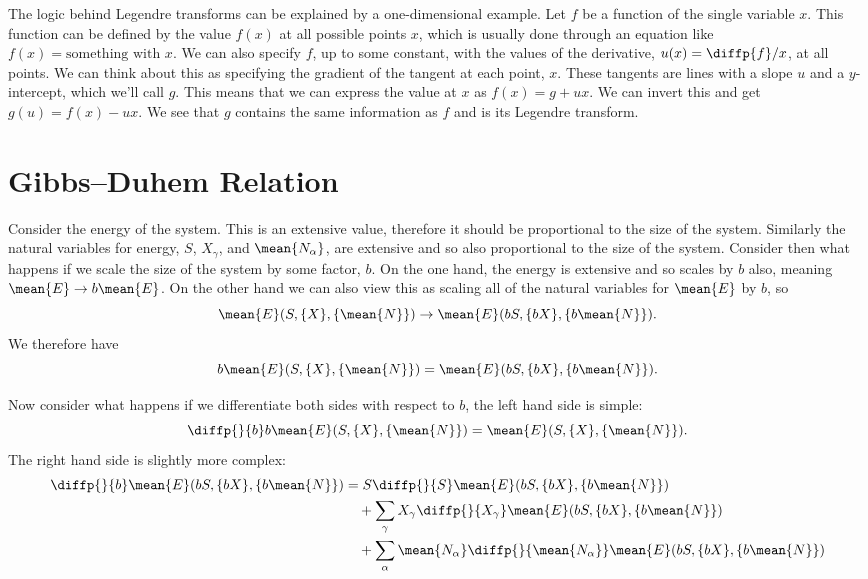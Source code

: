 \documentclass[fleqn]{NotesClass}
\begin{document}
    The logic behind Legendre transforms can be explained by a one-dimensional example.
    Let \(f\) be a function of the single variable \(x\).
    This function can be defined by the value \(f(x)\) at all possible points \(x\), which is usually done through an equation like \(f(x) = \text{something with }x\).
    We can also specify \(f\), up to some constant, with the values of the derivative, \(u(x) = \diffp{f}/{x}\), at all points.
    We can think about this as specifying the gradient of the tangent at each point, \(x\).
    These tangents are lines with a slope \(u\) and a \(y\)-intercept, which we'll call \(g\).
    This means that we can express the value at \(x\) as \(f(x) = g + ux\).
    We can invert this and get \(g(u) = f(x) - ux\).
    We see that \(g\) contains the same information as \(f\) and is its Legendre transform.
    
    \section{Gibbs--Duhem Relation}
    Consider the energy of the system.
    This is an extensive value, therefore it should be proportional to the size of the system.
    Similarly the natural variables for energy, \(S\), \(X_\gamma\), and \(\mean{N_\alpha}\), are extensive and so also proportional to the size of the system.
    Consider then what happens if we scale the size of the system by some factor, \(b\).
    On the one hand, the energy is extensive and so scales by \(b\) also, meaning \(\mean{E} \to b\mean{E}\).
    On the other hand we can also view this as scaling all of the natural variables for \(\mean{E}\) by \(b\), so
    \begin{equation}
        \mean{E}(S, \{X\}, \{\mean{N}\}) \to \mean{E}(bS, \{bX\}, \{b\mean{N}\}).
    \end{equation}
    We therefore have
    \begin{equation}
        b\mean{E}(S, \{X\}, \{\mean{N}\}) = \mean{E}(bS, \{bX\}, \{b\mean{N}\}).
    \end{equation}
    
    Now consider what happens if we differentiate both sides with respect to \(b\), the left hand side is simple:
    \begin{equation}
        \diffp{}{b} b\mean{E}(S, \{X\}, \{\mean{N}\}) = \mean{E}(S, \{X\}, \{\mean{N}\}).
    \end{equation}
    The right hand side is slightly more complex:
    \begin{align}
        \diffp{}{b}\mean{E}(bS, \{bX\}, \{b\mean{N}\}) &= S\diffp{}{S}\mean{E}(bS, \{bX\}, \{b\mean{N}\})\\
        &\quad+ \sum_{\gamma} X_\gamma\diffp{}{X_{\gamma}}\mean{E}(bS, \{bX\}, \{b\mean{N}\})\\
        &\quad+ \sum_{\alpha} \mean{N_\alpha} \diffp{}{\mean{N_{\alpha}}}\mean{E}(bS, \{bX\}, \{b\mean{N}\})
    \end{align}
\end{document}
